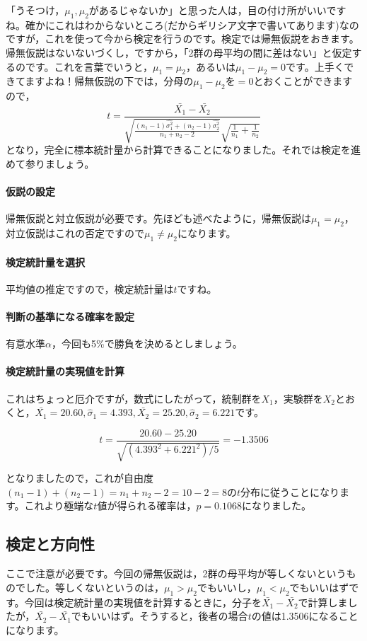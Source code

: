\documentclass{ltjsarticle}
\begin{document}
「うそつけ，$\mu_1,\mu_2$があるじゃないか」と思った人は，目の付け所がいいですね。確かにこれはわからないところ(だからギリシア文字で書いてあります)なのですが，これを使って今から検定を行うのです。検定では帰無仮説をおきます。帰無仮説はないないづくし，ですから，「2群の母平均の間に差はない」と仮定するのです。これを言葉でいうと，$\mu_1=\mu_2$，あるいは$\mu_1-\mu_2=0$です。上手くできてますよね！帰無仮説の下では，分母の$\mu_1-\mu_2$を$=0$とおくことができますので，
\[ t = \frac{\bar{X_1}-\bar{X_2}}{\sqrt{\frac{(n_1-1)\hat{\sigma_1^2}+(n_2-1)\hat{\sigma_2^2}}{n_1+n_2 - 2}}\sqrt{\frac{1}{n_1}+\frac{1}{n_2}}}\]
となり，完全に標本統計量から計算できることになりました。それでは検定を進めて参りましょう。
\paragraph{仮説の設定}帰無仮説と対立仮説が必要です。先ほども述べたように，帰無仮説は$\mu_1=\mu_2$，対立仮説はこれの否定ですので$\mu_1 \neq \mu_2$になります。
\paragraph{検定統計量を選択}平均値の推定ですので，検定統計量は$t$ですね。
\paragraph{判断の基準になる確率を設定}有意水準$\alpha$，今回も5\%で勝負を決めるとしましょう。
\paragraph{検定統計量の実現値を計算}これはちょっと厄介ですが，数式にしたがって，統制群を$X_1$，実験群を$X_2$とおくと，$\bar{X_1}=20.60,\hat{\sigma}_1=4.393,\bar{X_2}=25.20,\hat{\sigma}_2=6.221$です。

\[ t = \frac{20.60-25.20}{\sqrt{(4.393^2+6.221^2)/5}} = -1.3506\]

となりましたので，これが自由度$(n_1-1)+(n_2-1)=n_1+n_2-2=10-2=8$の$t$分布に従うことになります。これより極端な$t$値が得られる確率は，$p=0.1068$になりました。
\subsection{検定と方向性}
ここで注意が必要です。今回の帰無仮説は，2群の母平均が等しくないというものでした。等しくないというのは，$\mu_1>\mu_2$でもいいし，$\mu_1<\mu_2$でもいいはずです。今回は検定統計量の実現値を計算するときに，分子を$\bar{X_1}-\bar{X_2}$で計算しましたが，$\bar{X_2}-\bar{X_1}$でもいいはず。そうすると，後者の場合$t$の値は1.3506になることになります。
\end{document}
